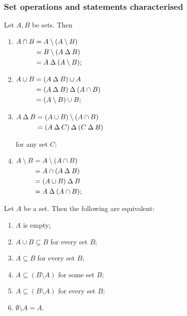 \subsubsection{Set operations and statements characterised}
\begin{lemma}
Let $A,B$ be sets. Then
\begin{enumerate}
\item $\begin{aligned}[t]
A\cap B &= A\setminus (A\setminus B) \\
&= B\setminus (A\mathbin{\Delta} B) \\
&= A\mathbin{\Delta} (A\setminus B);
\end{aligned}$
\item $\begin{aligned}[t]
A\cup B &= (A\mathbin{\Delta} B)\cup A \\
&= (A\mathbin{\Delta} B)\mathbin{\Delta}(A\cap B) \\
&= (A\setminus B)\cup B;
\end{aligned}$
\item $\begin{aligned}[t]
A\mathbin{\Delta} B &= (A\cup B)\setminus (A\cap B) \\
&= (A\mathbin{\Delta} C)\mathbin{\Delta}(C\mathbin{\Delta} B)
\end{aligned}$

for any set $C$;
\item $\begin{aligned}[t]
A\setminus B &= A\setminus (A\cap B) \\
&= A\cap(A\mathbin{\Delta} B) \\
&= (A\cup B)\mathbin{\Delta} B \\
&= A\mathbin{\Delta} (A\cap B);
\end{aligned}$
\end{enumerate}
\end{lemma}

\begin{lemma}
Let $A$ be a set. Then the following are equivalent:
\begin{enumerate}
\item $A$ is empty;
\item $A\cup B\subseteq B$ for every set $B$;
\item $A\subseteq B$ for every set $B$;
\item $A\subseteq (B\setminus A)$ for some set $B$;
\item $A\subseteq (B\setminus A)$ for every set $B$;
\item $\emptyset \setminus A= A$.
\end{enumerate}
\end{lemma}

